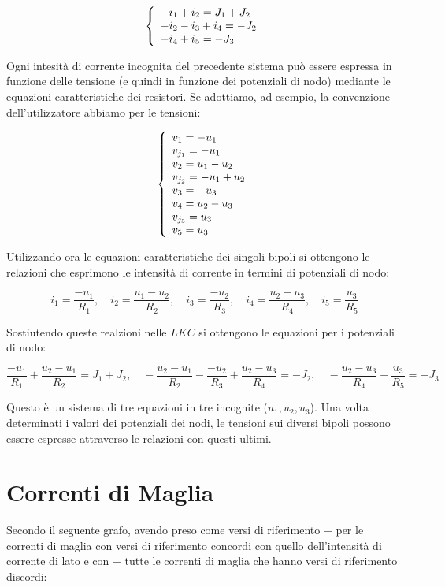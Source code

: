 \documentclass[a4paper]{report}
\begin{document}
\[
\left\{
\begin{array}{l l l}
  -i_1+i_2=J_1+J_2\\
  -i_2-i_3+i_4=-J_2\\
  -i_4+i_5=-J_3
\end{array}\right.
\]

Ogni intesit\`a di corrente incognita del precedente sistema pu\`o
essere espressa in funzione delle tensione (e quindi in funzione dei
potenziali di nodo) mediante le equazioni caratteristiche dei
resistori. Se adottiamo, ad esempio, la convenzione dell'utilizzatore
abbiamo per le tensioni:

\[
\left\{
\begin{array}{l l l l l l l l}
  v_1=-u_1\\
  v_{j_1}=-u_1\\
  v_2=u_1-u_2\\
  v_{j_2}=-u_1+u_2\\
  v_3=-u_3\\
  v_4=u_2-u_3\\
  v_{j_3}=u_3\\
  v_5=u_3 
\end{array} \right.
\]

Utilizzando ora le equazioni caratteristiche dei singoli bipoli si
ottengono le relazioni che esprimono le intensit\`a di corrente in
termini di potenziali di nodo:

\[
i_1=\dfrac{-u_1}{R_1},\quad i_2=\dfrac{u_1-u_2}{R_2},\quad
i_3=\dfrac{-u_2}{R_3},\quad i_4=\dfrac{u_2-u_3}{R_4},\quad i_5=\dfrac{u_3}{R_5} 
\]

Sostiutendo queste realzioni nelle $LKC$ si ottengono le equazioni per
i potenziali di nodo:

\[
\dfrac{-u_1}{R_1}+\dfrac{u_2-u_1}{R_2}=J_1+J_2,\quad -\dfrac{u_2-u_1}{R_2}-
\dfrac{-u_2}{R_3}+\dfrac{u_2-u_3}{R_4}=-J_2,\quad
-\dfrac{u_2-u_3}{R_4}+\dfrac{u_3}{R_5}=-J_3
\]

Questo \`e un sistema di tre equazioni in tre incognite ($u_1, u_2,
u_3$). Una volta determinati i valori dei potenziali dei nodi, le
tensioni sui diversi bipoli possono essere espresse attraverso le
relazioni con questi ultimi.

\section{Correnti di Maglia}
Secondo il seguente grafo, avendo preso come versi di riferimento $+$ per
le correnti di maglia con versi di riferimento concordi con quello
dell'intensit\`a di corrente di lato e con $-$ tutte le correnti di
maglia che hanno versi di riferimento discordi:
\end{document}
